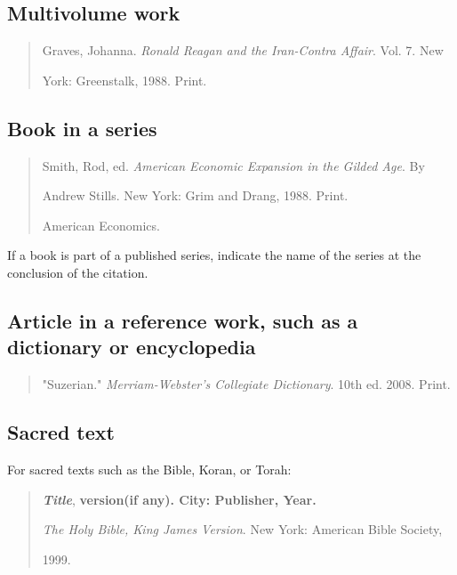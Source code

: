 \subsection{Multivolume work}
\begin{quote}

Graves, Johanna. \emph{Ronald Reagan and the Iran-Contra Affair}. Vol. 7. New 

\hspace{.4in}York: Greenstalk, 1988. Print.
\end{quote}

\subsection{Book in a series}

\begin{quote}

Smith, Rod, ed. \emph{American Economic Expansion in the Gilded Age}. By

\hspace{.4in} Andrew Stills. New York: Grim and Drang, 1988. Print.

\hspace{.4in}American Economics.
\end{quote}

 If a book is part of a published series, indicate the name of the series at the conclusion of the citation.

\subsection{Article in a reference work, such as a dictionary or encyclopedia}
\begin{quote}

"Suzerian." \emph{Merriam-Webster's Collegiate Dictionary}. 10th ed. 2008. Print.

\end{quote}

\subsection{Sacred text}

For sacred texts such as the Bible, Koran, or Torah:

\begin{quote}
\emph{\textbf{Title}}, \textbf{version(if any). City: Publisher, Year.}
\medskip

\emph{The Holy Bible, King James Version}. New York: American Bible Society, 

\hspace{.4in}1999.

\end{quote}

